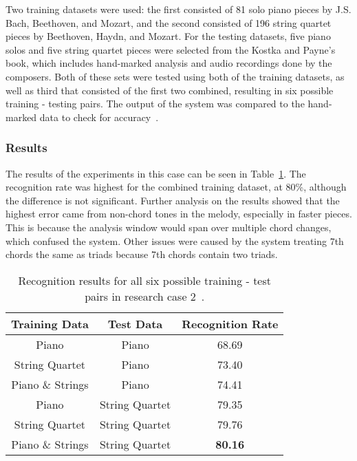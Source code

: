 \documentclass{sig-alternate}
\begin{document}
Two training datasets were used: the first consisted of 81 solo piano pieces by J.S. Bach, Beethoven, and Mozart, and the second consisted of 196 string quartet pieces by Beethoven, Haydn, and Mozart. For the testing datasets, five piano solos and five string quartet pieces were selected from the Kostka and Payne's book, which includes hand-marked analysis and audio recordings done by the composers. Both of these sets were tested using both of the training datasets, as well as third that consisted of the first two combined, resulting in six possible training - testing pairs. The output of the system was compared to the hand-marked data to check for accuracy~\cite{Lee:2006}. 

\subsubsection{Results}

The results of the experiments in this case can be seen in Table~\ref{tab:tab5}. The recognition rate was highest for the combined training dataset, at 80\%, although the difference is not significant. Further analysis on the results showed that the highest error came from non-chord tones in the melody, especially in faster pieces. This is because the analysis window would span over multiple chord changes, which confused the system. Other issues were caused by the system treating 7th chords the same as triads because 7th chords contain two triads.

\begin{table}[h]
\centering
\begin{tabular}{|c|c|c|} \hline
\textbf{Training Data} & \textbf{Test Data} & \textbf{Recognition Rate} \\ \hline
Piano & Piano & 68.69 \\ \hline
String Quartet & Piano & 73.40 \\ \hline
Piano \& Strings & Piano & 74.41 \\ \hline
Piano & String Quartet & 79.35 \\ \hline
String Quartet & String Quartet & 79.76 \\ \hline
Piano \& Strings & String Quartet & \textbf{80.16} \\ \hline
\end{tabular}
\caption{Recognition results for all six possible training - test pairs in research case 2~\cite{Lee:2006}.}
\label{tab:tab5}
\end{table}
\end{document}
